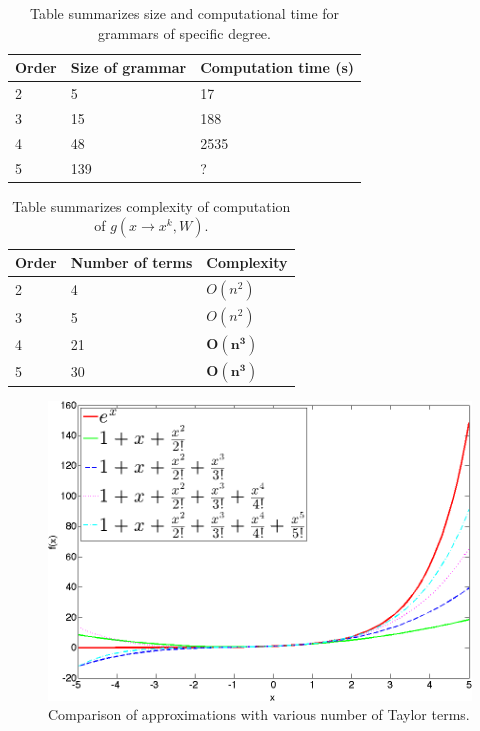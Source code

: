 \documentclass{article}
\begin{document}
\begin{table}
\tiny
\centering
\begin{tabular}{l||l|l|}
\hline\hline
Order & Size of grammar & Computation time (s) \\
\hline\hline
2 & 5 & 17 \\
3 & 15 & 188 \\
4 & 48 & 2535\\
5 & 139 & ? \\
\hline
\end{tabular}
\caption{Table summarizes size and computational time for grammars of specific degree.}
\label{grammars}
\end{table}

\begin{table}
\tiny
\centering
\begin{tabular}{||l|l|l|}
\hline
Order & Number of terms & Complexity \\
\hline\hline
2 & 4 & $O(n^2)$\\
3 & 5 & $O(n^2)$\\
4 & 21 & $\mathbf{O(n^3)}$\\
5 & 30 & $\mathbf{O(n^3)}$\\
\hline
\end{tabular}
\caption{Table summarizes complexity of computation of $g(x \rightarrow x^k, W)$.} 
\label{grammars}
\end{table}

\begin{figure}[h]
\centering
\includegraphics[scale=0.2]{img/approximations.png}
\caption{Comparison of approximations with various number of Taylor terms.}
\label{approximations}
\end{figure}
\end{document}
